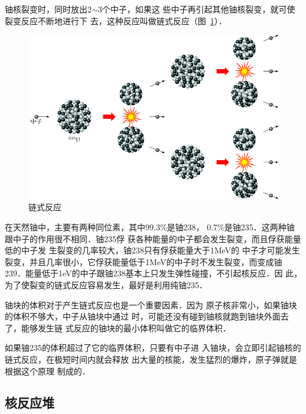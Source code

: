 铀核裂变时，同时放出2$\sim$3个中子，如果这
些中子再引起其他铀核裂变，就可使裂变反应不断地进行下
去，这种反应叫做链式反应（图~\ref{fig_C_9-13}）．

\begin{figure}[htbp]
    \centering
    \includegraphics{fig/C/9-13.pdf}
    \caption{链式反应}\label{fig_C_9-13}
\end{figure}


在天然铀中，主要有两种同位素，其中99.3\%是铀238，
0.7\%是铀235．这两种铀跟中子的作用很不相同．铀235俘
获各种能量的中子都会发生裂变，而且俘获能量低的中子发
生裂变的几率较大，铀238只有俘获能量大于1MeV的
中子才可能发生裂变，并且几率很小，它俘获能量低于1MeV的中子时不发生裂变，而变成铀239．能量低于1eV的中子跟铀238基本上只发生弹性碰撞，不引起核反应．因
此，为了使裂变的链式反应容易发生，最好是利用纯铀235．

铀块的体积对于产生链式反应也是一个重要因素．因为
原子核非常小，如果铀块的体积不够大，中子从铀块中通过
时，可能还没有碰到铀核就跑到铀块外面去了，能够发生链
式反应的铀块的最小体积叫做它的临界体积．

如果铀235的体积超过了它的临界体积，只要有中子进
入铀块，会立即引起铀核的链式反应，在极短时间内就会释放
出大量的核能，发生猛烈的爆炸，原子弹就是根据这个原理
制成的．

\subsection{核反应堆}


